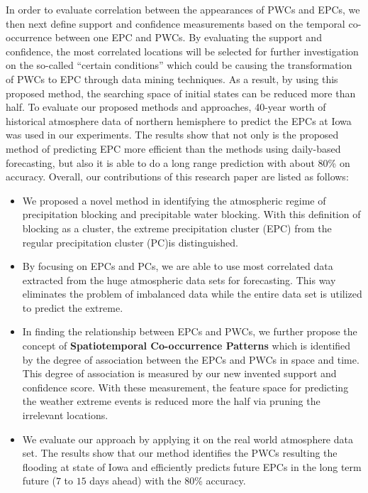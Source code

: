 \documentclass{acm_proc_article-sp}
\begin{document}
\newline In order to evaluate correlation between the appearances of PWCs and
EPCs, we then next define support and confidence measurements based on the
temporal co-occurrence between one EPC and PWCs. By evaluating the support and
confidence, the most correlated locations will be selected for further
investigation on the so-called ``certain conditions'' which could be causing the
transformation of PWCs to EPC through data mining techniques. As a result, by using this proposed method, the searching space of initial states can be reduced more than half.
\newline
To evaluate our proposed methods and approaches, 40-year worth of
historical atmosphere data of northern hemisphere to predict the EPCs at
Iowa was used in our experiments. The results show that not only is the proposed method
of predicting EPC more efficient than the methods using daily-based
forecasting, but also it is able to do a long range prediction with about 80\% on
accuracy.
\newline Overall, our contributions of this research paper are listed as
follows:
\begin{itemize}
\item We proposed a novel method in identifying the atmospheric regime of
precipitation blocking and precipitable water blocking. With this
definition of blocking as a cluster, the extreme precipitation cluster (EPC) from the regular precipitation cluster (PC)is distinguished. 
\item By focusing on EPCs and PCs, we are able to use most correlated data
extracted from the huge atmospheric data sets for forecasting. This way
eliminates the problem of imbalanced data while the entire data set is utilized to
predict the extreme.
\item In finding the relationship between EPCs and PWCs, we further propose
the concept of \textbf{Spatiotemporal Co-occurrence Patterns} which is
identified by the degree of association between the EPCs and PWCs in space and
time. This degree of association is measured by our new invented support and
confidence score. With these measurement, the feature
space for predicting the weather extreme events is reduced more the half via pruning the
irrelevant locations.
\item We evaluate our approach by applying it on the real world atmosphere data
set. The results show that our method identifies the PWCs resulting the
flooding at state of Iowa and efficiently predicts future EPCs in the long
term future ($7$ to $15$ days ahead) with the 80\% accuracy.
\end{itemize}
\end{document}
